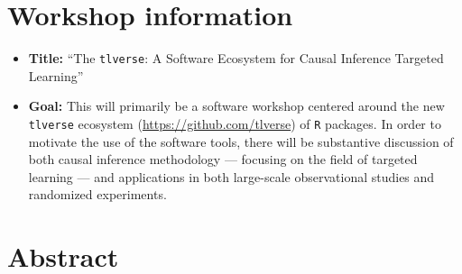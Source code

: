 \documentclass[a4paper,11pt]{texMemo}
\newcommand{\note}[2][]{\added[#1,remark={#2}]{}}
\begin{document}
\maketitle
\vspace{-0.25in}
\section{Workshop information}\note[id=RP]{Remove this section header and simply including the title, saves space}

\begin{itemize}
  \itemsep1pt
  \item \textbf{Title:} ``The \texttt{tlverse}: A Software Ecosystem for Causal Inference
    Targeted Learning'' \note[id=RP]{or, ...Ecosystem of Targeted Learning for Causal Inference.}
  \item \textbf{Goal:} This will primarily be a software workshop centered around the new \texttt{tlverse} ecosystem (\url{https://github.com/tlverse}) of \texttt{R} packages. In order to motivate the use of the software tools, there will be substantive discussion\note[id=RP]{I think "discussion" is weak here. This "Goal" paragraph is the most important part of the document since it comes first. It doesn't appear to be required \textbf{I think it should be omitted}. Omission will force the reviewer to actually read the abstract instead of reading this summarized version of it} of both causal inference methodology --- focusing on the field of targeted learning --- and applications in both large-scale observational studies and randomized experiments.
\end{itemize}

\section{Abstract}
\end{document}
